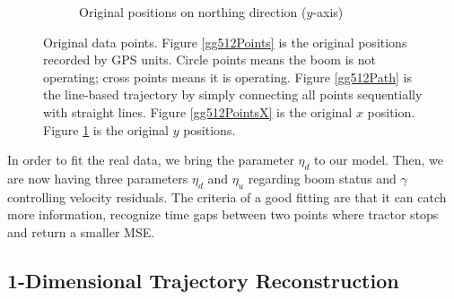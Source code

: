 \begin{figure}
\begin{subfigure}{0.45\textwidth}
\caption{Original positions on northing direction ($y$-axis)}\label{gg512PointsY}
\end{subfigure}
\caption{Original data points. Figure \ref{gg512Points} is the original positions recorded by GPS units. Circle points means the boom is not operating; cross points means it is operating. Figure \ref{gg512Path} is the line-based trajectory by simply connecting all points sequentially with straight lines. Figure \ref{gg512PointsX} is the original $x$ position. Figure \ref{gg512PointsY} is the original $y$ positions.}\label{original512}
 \end{figure}


In order to fit the real data, we bring the parameter $\eta_d$ to our model. Then, we are now having three parameters $\eta_d$ and $\eta_u$ regarding boom status and $\gamma$ controlling velocity residuals. The criteria of a good fitting are that it can catch more information, recognize time gaps between two points where tractor stops and return a smaller MSE. 



\subsection{1-Dimensional Trajectory Reconstruction}

